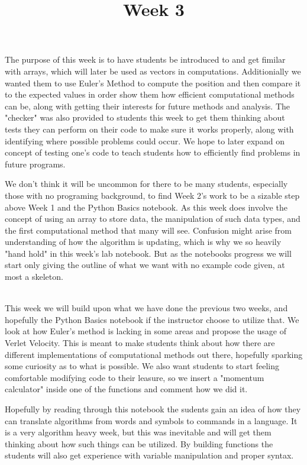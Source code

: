 \documentclass[12pt, letterpaper, twoside]{report}
\begin{document}
The purpose of this week is to have students be introduced to and get fimilar with arrays, which will later be used as vectors in computations. Additionially we wanted them to use Euler's Method to compute the position and then compare it to the expected values in order show them how efficient computational methods can be, along with getting their interests for future methods and analysis. The "checker" was also provided to students this week to get them thinking about tests they can perform on their code to make sure it works properly, along with identifying where possible problems could occur. We hope to later expand on concept of testing one's code to teach students how to efficiently find problems in future programs.

We don't think it will be uncommon for there to be many students, especially those with no programing background, to find Week 2's work to be a sizable step above Week 1 and the Python Basics notebook. As this week does involve the concept of using an array to store data, the manipulation of such data types, and the first computational method that many will see. Confusion might arise from understanding of how the algorithm is updating, which is why we so heavily "hand hold" in this week's lab notebook. But as the notebooks progress we will start only giving the outline of what we want with no example code given, at most a skeleton.

\newpage
\title{
	\large{Week 3}}\\

This week we will build upon what we have done the previous two weeks, and hopefully the Python Basics notebook if the instructor choose to utilize that. We look at how Euler's method is lacking in some areas and propose the usage of Verlet Velocity. This is meant to make students think about how there are different implementations of computational methods out there, hopefully sparking some curiosity as to what is possible. We also want students to start feeling comfortable modifying code to their leasure, so we insert a "momentum calculator" inside one of the functions and comment how we did it.

Hopefully by reading through this notebook the sudents gain an idea of how they can translate algorithms from words and symbols to commands in a language. It is a very algorithm heavy week, but this was inevitable and will get them thinking about how such things can be utilized. By building functions the students will also get experience with variable manipulation and proper syntax.
\end{document}
